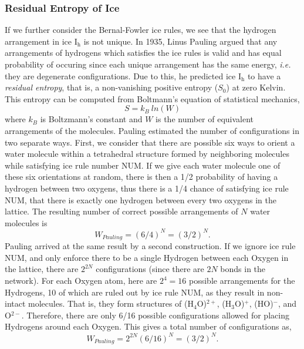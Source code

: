 \subsubsection{Residual Entropy of Ice}
If we further consider the Bernal-Fowler ice rules, we see that the
hydrogen arrangement in ice I$_\mathrm{h}$ is not unique. In 1935,
Linus Pauling argued that any arrangements of hydrogens which
satisfies the ice rules is valid and has equal probability of
occuring since each unique arrangement has the same energy,
\textit{i.e.} they are degenerate configurations. Due to this, he
predicted ice I$_\mathrm{h}$ to have a \textit{residual entropy}, that is, a
non-vanishing positive entropy ($S_{0}$) at zero Kelvin. This entropy
can be computed from Boltmann's equation of statistical mechanics,
\begin{equation}\label{Boltzmann-W}
S = k_{B}~ln(W)
\end{equation}
where $k_{B}$ is Boltzmann's constant and $W$ is the number of
equivalent arrangements of the molecules. Pauling estimated the number
of configurations in two separate ways.\cite{Pauling1935} First, we
consider that there are possible six ways to orient a water molecule
within a tetrahedral structure formed by neighboring molecules while
satisfying ice rule number NUM. If we give each water molecule one of
these six orientations at random, there is then a 1/2 probability of
having a hydrogen between two oxygens, thus there is a 1/4 chance of
satisfying ice rule NUM, that there is exactly one hydrogen between
every two oxygens in the lattice. The resulting number of correct
possible arrangements of $N$ water molecules is
\begin{equation} \label{Pauling-1}
W_{Pauling} = (6/4)^{N} = (3/2)^{N}.
\end{equation}   
Pauling arrived at the same result by a second construction. If we
ignore ice rule NUM, and only enforce there to be a single Hydrogen
between each Oxygen in the lattice, there are $2^{2N}$ configurations
(since there are $2N$ bonds in the network). For each Oxygen atom,
here are $2^{4} = 16$ possible arrangements for the Hydrogens, 10 of
which are ruled out by ice rule NUM, as they result in non-intact
molecules. That is, they form structures of (H$_{4}$O)$^{2+}$,
(H$_{3}$O)$^{+}$, (HO)$^{-}$, and O$^{2-}$. Therefore, there are only
6/16 possible configurations allowed for placing Hydrogens around each
Oxygen. This gives a total number of configurations as,
\begin{equation}
W_{Pauling} = 2^{2N}(6/16)^{N} = (3/2)^{N}.
\end{equation}
